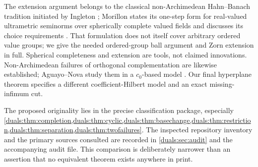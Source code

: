 \documentclass[11pt,letterpaper]{article}
\numberwithin{equation}{section}
\theoremstyle{definition}
\theoremstyle{remark}
\begin{document}
The extension argument belongs to the classical non-Archimedean
Hahn--Banach tradition initiated by Ingleton \cite{Ingleton}; Morillon
states its one-step form for real-valued ultrametric seminorms over
spherically complete valued fields and discusses its choice requirements \cite[Section~3.1.2, Lemma~2]{Morillon}.
That formulation does not itself cover arbitrary ordered value groups;
we give the needed ordered-group ball argument and Zorn extension in
full. Spherical completeness and extension are tools, not claimed
innovations. Non-Archimedean failures of orthogonal complementation
are likewise established; Aguayo--Nova study them in a $c_0$-based
model \cite{AN}. Our final hyperplane theorem specifies a different
coefficient-Hilbert model and an exact missing-infimum cut.

The proposed originality lies in the precise classification package,
especially \cref{duals:thm:completion,duals:thm:cyclic,duals:thm:basechange,duals:thm:restriction,duals:thm:separation,duals:thm:twofailures}. The inspected repository inventory and
the primary sources consulted are recorded in \cref{duals:sec:audit} and the
accompanying audit file. This comparison is deliberately narrower than
an assertion that no equivalent theorem exists anywhere in print.
\end{document}
